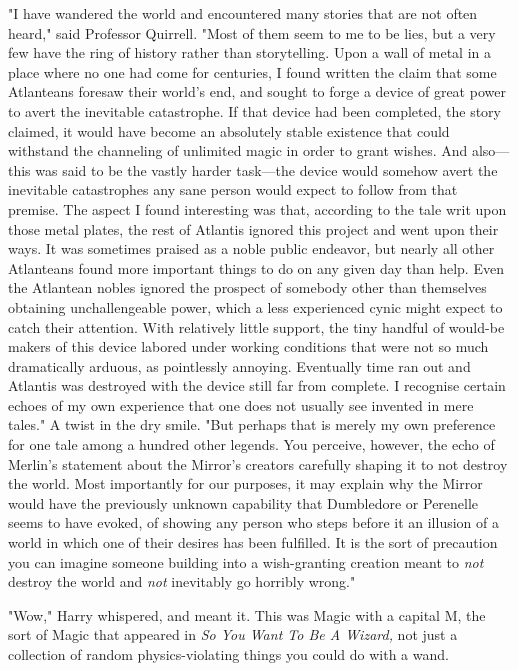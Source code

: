 "I have wandered the world and encountered many stories that are not often 
heard," said Professor Quirrell. "Most of them seem to me to be lies, but a 
very few have the ring of history rather than storytelling. Upon a wall of 
metal in a place where no one had come for centuries, I found written the claim 
that some Atlanteans foresaw their world's end, and sought to forge a device of 
great power to avert the inevitable catastrophe. If that device had been 
completed, the story claimed, it would have become an absolutely stable 
existence that could withstand the channeling of unlimited magic in order to 
grant wishes. And also---this was said to be the vastly harder task---the 
device would somehow avert the inevitable catastrophes any sane person would 
expect to follow from that premise. The aspect I found interesting was that, 
according to the tale writ upon those metal plates, the rest of Atlantis 
ignored this project and went upon their ways. It was sometimes praised as a 
noble public endeavor, but nearly all other Atlanteans found more important 
things to do on any given day than help. Even the Atlantean nobles ignored the 
prospect of somebody other than themselves obtaining unchallengeable power, 
which a less experienced cynic might expect to catch their attention. With 
relatively little support, the tiny handful of would-be makers of this device 
labored under working conditions that were not so much dramatically arduous, as 
pointlessly annoying. Eventually time ran out and Atlantis was destroyed with 
the device still far from complete. I recognise certain echoes of my own 
experience that one does not usually see invented in mere tales." A twist in 
the dry smile. "But perhaps that is merely my own preference for one tale among 
a hundred other legends. You perceive, however, the echo of Merlin's statement 
about the Mirror's creators carefully shaping it to not destroy the world. Most 
importantly for our purposes, it may explain why the Mirror would have the 
previously unknown capability that Dumbledore or Perenelle seems to have 
evoked, of showing any person who steps before it an illusion of a world in 
which one of their desires has been fulfilled. It is the sort of precaution you 
can imagine someone building into a wish-granting creation meant to \emph{not} 
destroy the world and \emph{not} inevitably go horribly wrong."

"Wow," Harry whispered, and meant it. This was Magic with a capital M, the sort 
of Magic that appeared in \emph{So You Want To Be A Wizard,} not just a 
collection of random physics-violating things you could do with a wand.

